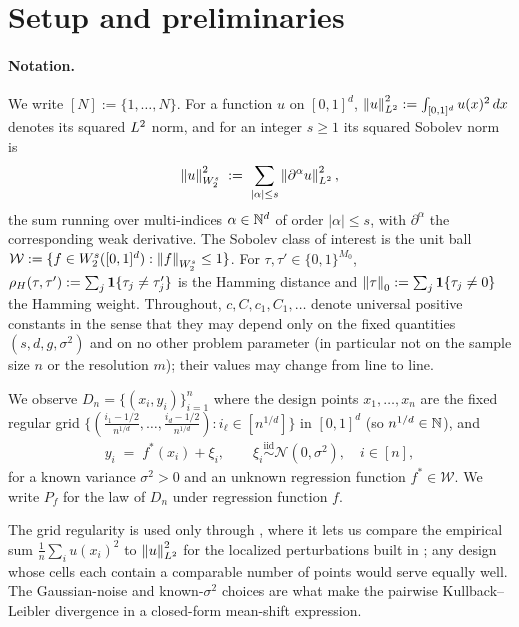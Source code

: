 \section{Setup and preliminaries}\label{sec:prelim}

\paragraph{Notation.}
We write $[N] := \{1,\dots,N\}$. For a function $u$ on $[0,1]^d$,
$\left\| u \right\|_{L^{2}}^2 := \int_{[0,1]^d} u(x)^2\,dx$ denotes its squared $L^{2}$
norm, and for an integer $s\ge 1$ its squared Sobolev norm is
\begin{align}\label{eq:sobolev-norm}
\left\| u \right\|_{W^{s}_{2}}^2 \;:=\; \sum_{|\alpha|\le s} \left\| \partial^{\alpha}u \right\|_{L^{2}}^2,
\end{align}
the sum running over multi-indices $\alpha\in\mathbb{N}^d$ of order $|\alpha|\le s$,
with $\partial^{\alpha}$ the corresponding weak derivative. The Sobolev class
of interest is the unit ball
$\mathcal{W} := \{ f\in W^{s}_{2}([0,1]^d) : \left\| f \right\|_{W^{s}_{2}}\le 1\}$.
For $\tau,\tau'\in\{0,1\}^{M_0}$, $\rho_{H}(\tau,\tau') := \sum_{j}\mathbf{1}\{\tau_j\ne\tau'_j\}$
is the Hamming distance and $\left\| \tau \right\|_{0} := \sum_j \mathbf{1}\{\tau_j\ne 0\}$ the
Hamming weight. Throughout, $c, C, c_1, C_1, \dots$ denote universal positive
constants in the sense that they may depend only on the fixed quantities
$(s,d,g,\sigma^2)$ and on no other problem parameter (in particular not on the
sample size $n$ or the resolution $m$); their values may change from line to
line.

\begin{assumption}\label{ass:setup}
We observe $D_n = \{(x_i,y_i)\}_{i=1}^n$ where the design points
$x_1,\dots,x_n$ are the fixed regular grid
$\{(\tfrac{i_1-1/2}{n^{1/d}},\dots,\tfrac{i_d-1/2}{n^{1/d}}) : i_\ell\in[n^{1/d}]\}$
in $[0,1]^d$ (so $n^{1/d}\in\mathbb{N}$), and
\begin{align}\label{eq:model}
y_i \;=\; f^*(x_i) + \xi_i, \qquad \xi_i \stackrel{\mathrm{iid}}{\sim} \mathcal{N}(0,\sigma^2),
\quad i\in[n],
\end{align}
for a known variance $\sigma^2>0$ and an unknown regression function
$f^*\in\mathcal{W}$. We write $P_{f}$ for the law of $D_n$ under regression
function $f$.
\end{assumption}

\begin{remark}\label{rem:setup}
The grid regularity is used only through , where it lets us
compare the empirical sum $\frac1n\sum_i u(x_i)^2$ to $\left\| u \right\|_{L^{2}}^2$ for
the localized perturbations built in ; any design whose cells
each contain a comparable number of points would serve equally well. The
Gaussian-noise and known-$\sigma^2$ choices are what make the
pairwise Kullback--Leibler divergence in  a closed-form
mean-shift expression.
\end{remark}

